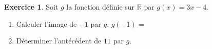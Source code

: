 \documentclass[12pt]{exam}
\theoremstyle{definition}
\newtheorem{exercice}{Exercice}
\newcommand{\pt}[1][2.5cm]{\makebox[#1]{\dotfill}}
\begin{document}
\vfill
\begin{exercice}
Soit $g$ la fonction définie sur $\mathbb{R}$ par $g(x) = 3x-4$.
\begin{enumerate}[label=\arabic*., itemsep=1.2em, topsep=0.6em]
\item Calculer l'image de $-1$ par $g$. \hfill $g(-1)=$ \pt[4cm] \hspace*{1cm}
\item Déterminer l'antécédent de $11$ par $g$.

\end{enumerate}
\end{exercice}

\vfill
\end{document}

